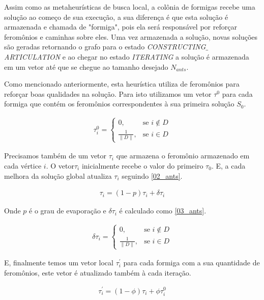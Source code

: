 \documentclass[conference,compsoc]{IEEEtran}
\begin{document}
Assim como as metaheurísticas  de busca local, a colônia de formigas recebe uma solução ao começo de sua execução, a sua diferença é que esta solução é armazenada e chamada de "formiga", pois ela será responsável por reforçar feromônios e caminhas sobre eles. Uma vez armazenada a solução, novas soluções são geradas retornando o grafo para o estado \textit{CONSTRUCTING$\_$ARTICULATION} e ao chegar no estado \textit{ITERATING} a solução é armazenada em um vetor até que se chegue ao tamanho desejado $N_{ants}$.

Como mencionado anteriormente, esta heurística utiliza de feromônios para reforçar boas qualidades na solução. Para isto utilizamos um vetor $\tau^0$ para cada formiga que contém os feromônios correspondentes à sua primeira solução $S_0$.

\begin{eqnarray*}
    \tau_i^0 = \begin{cases} 
                0, & \mbox{se } i \notin D\\ 
                \frac{1}{\| D\|}, & \mbox{se } i \in D
                \end{cases}
    \label{01_ants}
\end{eqnarray*}

Precisamos também de um vetor $\tau_i$ que armazena o feromônio armazenado em cada vértice $i$. O vetor$\tau_i$ inicialmente recebe o valor do primeiro $\tau_0$. E, a cada melhora da solução global atualiza $\tau_i$ seguindo \ref{02_ants}.

\begin{eqnarray*}
    \tau_i = (1 - p) \tau_i + \delta\tau_i
    \label{02_ants}
\end{eqnarray*}

Onde $p$ é o grau de evaporação e $\delta\tau_i$ é calculado como \ref{03_ants}.

\begin{eqnarray*}
    \delta\tau_i = \begin{cases} 
                0, & \mbox{se } i \notin D\\ 
                \frac{1}{\| D\|}, & \mbox{se } i \in D
                \end{cases}
    \label{03_ants}
\end{eqnarray*}

E, finalmente temos um vetor local $\tau_i^{'}$ para cada formiga com a sua quantidade de feromônios, este vetor é atualizado também à cada iteração.

\begin{eqnarray*}
    \tau_i^{'} = (1 - \phi) \tau_i + \phi \tau^0_i
    \label{02_ants}
\end{eqnarray*}
\end{document}
